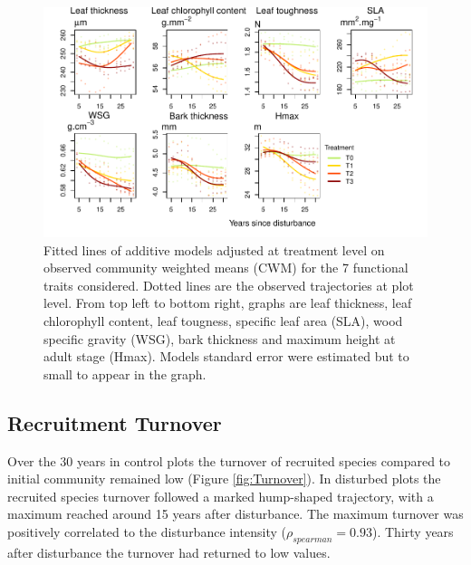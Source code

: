 \documentclass[fleqn,10pt]{ArtEcoFoG} %
\begin{document}
\begin{figure}

{\centering \includegraphics{RecruitmentTrajectories_files/figure-latex/CWM-1} 

}

\caption{Fitted lines of additive models adjusted at treatment level on observed community weighted means (CWM) for the 7 functional traits considered. Dotted lines are the observed trajectories at plot level. From top left to bottom right, graphs are leaf thickness, leaf chlorophyll content, leaf tougness, specific leaf area (SLA), wood specific gravity (WSG), bark thickness and maximum height at adult stage (Hmax). Models standard error were estimated but to small to appear in the graph.}\label{fig:CWM}
\end{figure}

\hypertarget{recruitment-turnover}{%
\subsection{Recruitment Turnover}\label{recruitment-turnover}}

Over the 30 years in control plots the turnover of recruited species compared to initial community remained low (Figure \ref{fig:Turnover}).
In disturbed plots the recruited species turnover followed a marked hump-shaped trajectory, with a maximum reached around 15 years after disturbance.
The maximum turnover was positively correlated to the disturbance intensity (\(\rho_{spearman}=0.93\)).
Thirty years after disturbance the turnover had returned to low values.
\end{document}
